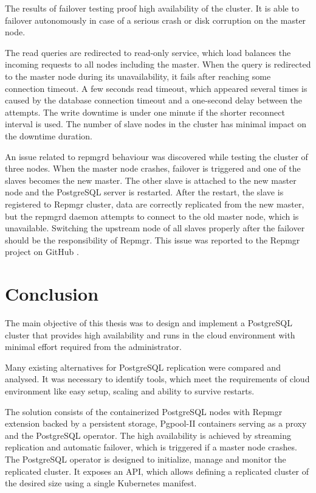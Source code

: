 \documentclass[
  digital, %
  twoside, %
  table,   %
  nolof,   %
  nolot,   %
]{fithesis3}
\begin{document}
The results of failover testing proof high availability of the cluster. It is able to failover autonomously in case of a serious crash or disk corruption on the master node.

The read queries are redirected to read-only service, which load balances the incoming requests to all nodes including the master. When the query is redirected to the master node during its unavailability, it fails after reaching some connection timeout.
A few seconds read timeout, which appeared several times is caused by the database connection timeout and a one-second delay between the attempts. The write downtime is under one minute if the shorter reconnect interval is used. The number of slave nodes in the cluster has minimal impact on the downtime duration.

An issue related to repmgrd behaviour was discovered while testing the cluster of three nodes. When the master node crashes, failover is triggered and one of the slaves becomes the new master. The other slave is attached to the new master node and the PostgreSQL server is restarted. After the restart, the slave is registered to Repmgr cluster, data are correctly replicated from the new master, but the repmgrd daemon attempts to connect to the old master node, which is unavailable. Switching the upstream node of all slaves properly after the failover should be the responsibility of Repmgr. This issue was reported to the Repmgr project on GitHub \cite{repmgrd_issue}.


\chapter{Conclusion} \label{chap:conclusion}
The main objective of this thesis was to design and implement a PostgreSQL cluster that provides high availability and runs in the cloud environment with minimal effort required from the administrator.

Many existing alternatives for PostgreSQL replication were compared and analysed. It was necessary to identify tools, which meet the requirements of cloud environment like easy setup, scaling and ability to survive restarts.

The solution consists of the containerized PostgreSQL nodes with Repmgr extension backed by a persistent storage, Pgpool-II containers serving as a proxy and the PostgreSQL operator. The high availability is achieved by streaming replication and automatic failover, which is triggered if a master node crashes. The PostgreSQL operator is designed to initialize, manage and monitor the replicated cluster. It exposes an API, which allows defining a replicated cluster of the desired size using a single Kubernetes manifest.
\end{document}
